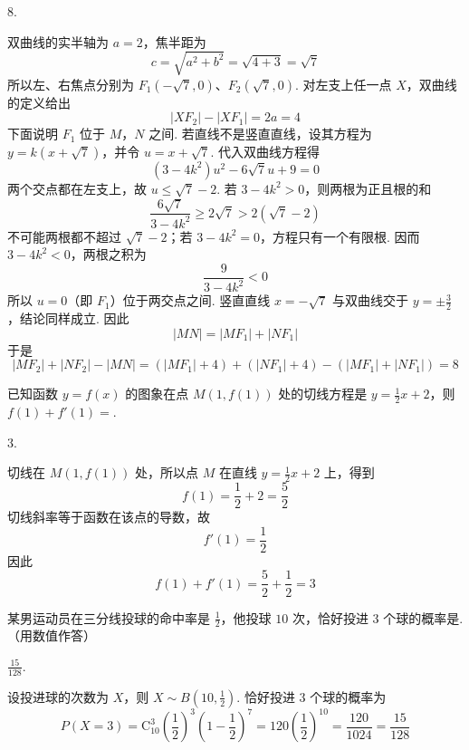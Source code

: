 \begin{answer}
\(8\).
\end{answer}

\begin{solution}
双曲线的实半轴为 \(a=2\)，焦半距为
\[
c=\sqrt{a^2+b^2}=\sqrt{4+3}=\sqrt7
\]
所以左、右焦点分别为 \(F_1(-\sqrt7,0)\)、\(F_2(\sqrt7,0)\). 对左支上任一点 \(X\)，双曲线的定义给出
\[
|XF_2|-|XF_1|=2a=4
\]
下面说明 \(F_1\) 位于 \(M\)，\(N\) 之间. 若直线不是竖直直线，设其方程为 \(y=k(x+\sqrt7)\)，并令 \(u=x+\sqrt7\). 代入双曲线方程得
\[
(3-4k^2)u^2-6\sqrt7u+9=0
\]
两个交点都在左支上，故 \(u\leqslant\sqrt7-2\). 若 \(3-4k^2>0\)，则两根为正且根的和
\[
\frac{6\sqrt7}{3-4k^2}\geqslant2\sqrt7>2(\sqrt7-2)
\]
不可能两根都不超过 \(\sqrt7-2\)；若 \(3-4k^2=0\)，方程只有一个有限根. 因而 \(3-4k^2<0\)，两根之积为
\[
\frac{9}{3-4k^2}<0
\]
所以 \(u=0\)（即 \(F_1\)）位于两交点之间. 竖直直线 \(x=-\sqrt7\) 与双曲线交于 \(y=\pm\frac32\)，结论同样成立. 因此
\[
|MN|=|MF_1|+|NF_1|
\]
于是
\[
|MF_2|+|NF_2|-|MN|
=(|MF_1|+4)+(|NF_1|+4)-(|MF_1|+|NF_1|)=8
\]
\end{solution}

\begin{problem}
已知函数 \( y = f(x) \) 的图象在点 \( M(1, f(1)) \) 处的切线方程是 \( y = \frac{1}{2} x + 2 \)，则 \( f(1) + f'(1) = \)\fillinblank{}.
\end{problem}

\begin{answer}
\(3\).
\end{answer}

\begin{solution}
切线在 \(M(1,f(1))\) 处，所以点 \(M\) 在直线 \(y=\frac12x+2\) 上，得到
\[
f(1)=\frac12+2=\frac52
\]
切线斜率等于函数在该点的导数，故
\[
f'(1)=\frac12
\]
因此
\[
f(1)+f'(1)=\frac52+\frac12=3
\]
\end{solution}

\begin{problem}
某男运动员在三分线投球的命中率是 \(\frac{1}{2}\)，他投球 \(10\) 次，恰好投进 \(3\) 个球的概率是\fillinblank{}. （用数值作答）
\end{problem}

\begin{answer}
\(\frac{15}{128}\).
\end{answer}

\begin{solution}
设投进球的次数为 \(X\)，则 \(X\sim B\left(10,\frac12\right)\). 恰好投进 \(3\) 个球的概率为
\[
P(X=3)=\mathrm C_{10}^3\left(\frac12\right)^3\left(1-\frac12\right)^7
=120\left(\frac12\right)^{10}
=\frac{120}{1024}=\frac{15}{128}
\]
\end{solution}

